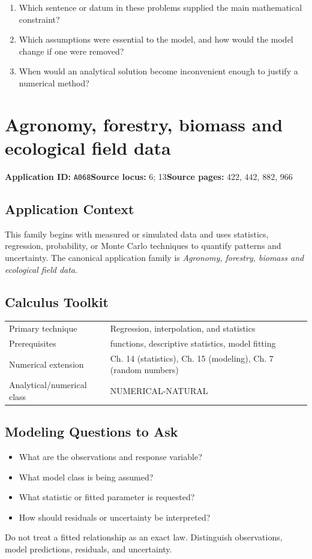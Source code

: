 \documentclass[11pt]{book}
\newcommand{\pid}[1]{\texttt{#1}}
\begin{document}
\begin{reflectionbox}\begin{enumerate}
\item Which sentence or datum in these problems supplied the main mathematical constraint?
\item Which assumptions were essential to the model, and how would the model change if one were removed?
\item When would an analytical solution become inconvenient enough to justify a numerical method?
\end{enumerate}\end{reflectionbox}
\chapter{Agronomy, forestry, biomass and ecological field data}\label{app:A068}
\textbf{Application ID:} \pid{A068}\quad \textbf{Source locus:} 6; 13\quad \textbf{Source pages:} 422, 442, 882, 966
\section*{Application Context}
This family begins with measured or simulated data and uses statistics, regression, probability, or Monte Carlo techniques to quantify patterns and uncertainty. The canonical application family is \emph{Agronomy, forestry, biomass and ecological field data}.
\section*{Calculus Toolkit}
\begin{tabularx}{\textwidth}{@{}lX@{}}\toprule
Primary technique & Regression, interpolation, and statistics \\
Prerequisites & functions, descriptive statistics, model fitting \\
Numerical extension & Ch. 14 (statistics), Ch. 15 (modeling), Ch. 7 (random numbers) \\
Analytical/numerical class & NUMERICAL-NATURAL \\
\bottomrule\end{tabularx}
\section*{Modeling Questions to Ask}\begin{itemize}
\item What are the observations and response variable?
\item What model class is being assumed?
\item What statistic or fitted parameter is requested?
\item How should residuals or uncertainty be interpreted?
\end{itemize}
\begin{errorbox}Do not treat a fitted relationship as an exact law. Distinguish observations, model predictions, residuals, and uncertainty.\end{errorbox}
\end{document}
